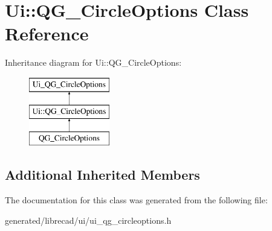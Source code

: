 \hypertarget{classUi_1_1QG__CircleOptions}{\section{Ui\-:\-:Q\-G\-\_\-\-Circle\-Options Class Reference}
\label{classUi_1_1QG__CircleOptions}
}
Inheritance diagram for Ui\-:\-:Q\-G\-\_\-\-Circle\-Options\-:\begin{figure}[H]
\begin{center}
\leavevmode
\includegraphics[height=3.000000cm]{classUi_1_1QG__CircleOptions}
\end{center}
\end{figure}
\subsection*{Additional Inherited Members}


The documentation for this class was generated from the following file\-:\begin{DoxyCompactItemize}
\item 
generated/librecad/ui/ui\-\_\-qg\-\_\-circleoptions.\-h\end{DoxyCompactItemize}

